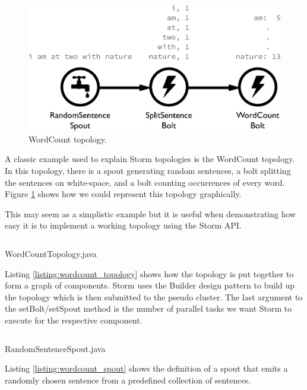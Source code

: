 \documentclass[bsc,logo,frontabs,twoside,singlespacing,normalheadings,parskip]{infthesis}     %
\begin{document}
\begin{figure}[!htb]
	\centering
	\includegraphics[scale=0.7]{pdf/wordcount_topology.pdf}
	\caption{WordCount topology.}
	\label{fig:wordcount_topology}
\end{figure}

A classic example used to explain Storm topologies is the WordCount topology. In this topology, there is a spout generating random sentences, a bolt splitting the sentences on white-space, and a bolt counting occurrences of every word. Figure \ref{fig:wordcount_topology} shows how we could represent this topology graphically.

This may seem as a simplistic example but it is useful when demonstrating how easy it is to implement a working topology using the Storm API.

\begin{listing}[!htb]
\inputminted{java}{code/WordCountTopology.java}
\caption{WordCountTopology.java}
\label{listing:wordcount_topology}
\end{listing}

Listing \ref{listing:wordcount_topology} shows how the topology is put together to form a graph of components. Storm uses the Builder design pattern to build up the topology which is then submitted to the pseudo cluster. The last argument to the setBolt/setSpout method is the number of parallel tasks we want Storm to execute for the respective component.

\newpage

\begin{listing}[!htb]
\inputminted{java}{code/RandomSentenceSpout.java}
\caption{RandomSentenceSpout.java}
\label{listing:wordcount_spout}
\end{listing}

Listing \ref{listing:wordcount_spout} shows the definition of a spout that emits a randomly chosen sentence from a predefined collection of sentences.
\end{document}
